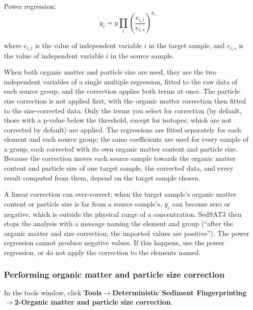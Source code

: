 \documentclass[12pt]{report}
\begin{document}
Power regression:
\begin{equation}
    y_c = y \prod_i \left(\frac{e_{i,t}}{e_{i,s}}\right)^{b_i}
\end{equation}

where $e_{i,t}$ is the value of independent variable $i$ in the target sample, and $e_{i,s}$ is the value of independent variable $i$ in the source sample.

When both organic matter and particle size are used, they are the two independent variables of a single multiple regression, fitted to the raw data of each source group, and the correction applies both terms at once. The particle size correction is not applied first, with the organic matter correction then fitted to the size-corrected data. Only the terms you select for correction (by default, those with a p-value below the threshold, except for isotopes, which are not corrected by default) are applied. The regressions are fitted separately for each element and each source group; the same coefficients are used for every sample of a group, each corrected with its own organic matter content and particle size. Because the correction moves each source sample towards the organic matter content and particle size of one target sample, the corrected data, and every result computed from them, depend on the target sample chosen.

\begin{tcolorbox}[colback=yellow!10,colframe=yellow!50!black,title=Note]
A linear correction can over-correct: when the target sample's organic matter content or particle size is far from a source sample's, $y_c$ can become zero or negative, which is outside the physical range of a concentration. SedSAT3 then stops the analysis with a message naming the element and group (``after the organic matter and size correction; the imported values are positive''). The power regression cannot produce negative values. If this happens, use the power regression, or do not apply the correction to the elements named.
\end{tcolorbox}

\subsubsection{Performing organic matter and particle size correction}

In the tools window, click \textbf{Tools}$\rightarrow$\textbf{Deterministic Sediment Fingerprinting}$\rightarrow$\textbf{2-Organic matter and particle size correction}.
\end{document}
